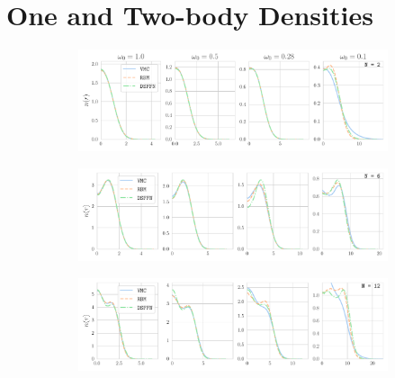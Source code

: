 \section{One and Two-body Densities}

\begin{figure}[H]
    \centering
    \begin{subfigure}[b]{0.82\textwidth}
        \centering
        \includegraphics[width=1.0\textwidth]{Chapters/Results/dots/radial_profile_N[2]_nqs_all.pdf}
        \label{fig:total_n2}
        \vspace{-0.4cm}
    \end{subfigure}
    \begin{subfigure}[c]{0.8\textwidth}
        \centering
        \includegraphics[width=1.0\textwidth]{Chapters/Results/dots/radial_profile_N[6]_nqs_all.pdf}
        \label{fig:total_n2}
        \vspace{-0.4cm}
    \end{subfigure}
    \begin{subfigure}[d]{0.8\textwidth}
        \centering
        \includegraphics[width=1.0\textwidth]{Chapters/Results/dots/radial_profile_N[12]_nqs_all.pdf}
        \label{fig:total_n4}
        \vspace{-0.4cm}

\end{subfigure}
\end{figure}
